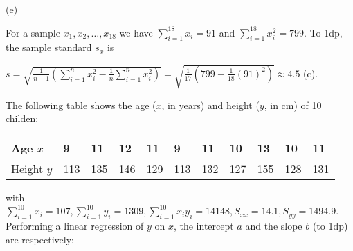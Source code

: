 \documentclass[bigtut]{tutorial}
\begin{document}
\begin{tutorial}
\begin{questions}


\begin{solution}
(e)
\end{solution}

\question 
For a sample $x_1,x_2,\ldots,x_{18}$ we have $\sum_{i=1}^{18} x_{i} = 91$ and $\sum_{i=1}^{18} x_{i}^2 = 799$.
To 1dp, the sample standard $s_{x}$ is 
\begin{solution}
$s = \sqrt{ \frac{1}{n-1} ( \sum_{i=1}^n x_i^2 - \frac{1}{n}\sum_{i=1}^{n} x_i^2) } =  \sqrt{ \frac{1}{17} (799-\frac{1}{18} (91)^2) } \approx 4.5$ (c).
\end{solution}



\question
The following table shows the age ($x$, in years) and height ($y$, in cm) of 10 childen:
\begin{center}
\begin{tabular}{l | llllllllll} 
Age $x$ & 9 & 11 & 12 & 11 & 9 & 11 & 10 & 13 & 10 & 11 \\ \hline
Height $y$ & 113 & 135 & 146 & 129 & 113 & 132 & 127 & 155 & 128 & 131 \\
\end{tabular}
\end{center}
with \\
$\sum_{i=1}^{10} x_{i} = 107, \sum_{i=1}^{10} y_{i} = 1309, \sum_{i=1}^{10} x_{i} y_{i} = 14148, S_{xx} = 14.1, S_{yy} = 1494.9$. \\
Performing a linear regression of $y$ on $x$, the intercept $a$ and the slope $b$ (to 1dp) are respectively:
\begin{parts}[5]

\end{parts}
\end{questions}
\end{tutorial}
\end{document}
